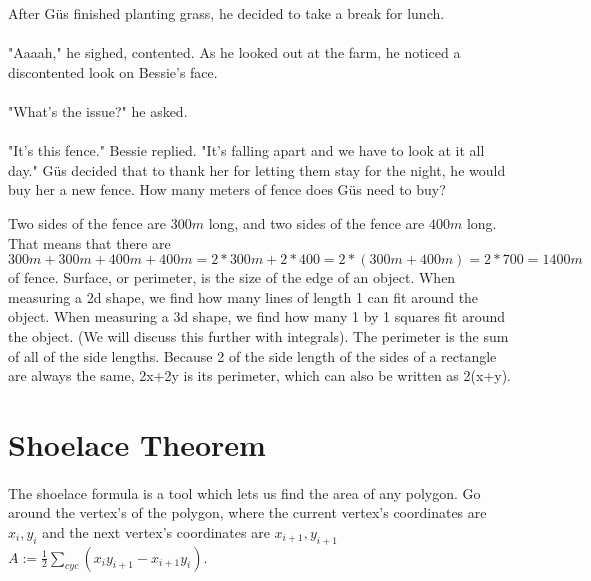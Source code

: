 {}
{After Güs finished planting grass, he decided to take a break for lunch. \paragraph{} "Aaaah," he sighed, contented. As he looked out at the farm, he noticed a discontented look on Bessie's face. \paragraph{}"What's the issue?" he asked. \paragraph{} "It's this fence." Bessie replied. "It's falling apart and we have to look at it all day." Güs decided that to thank her for letting them stay for the night, he would buy her a new fence. How many meters of fence does Güs need to buy?}
{Two sides of the fence are $300 m$ long, and two sides of the fence are $400 m$ long. That means that there are $300 m + 300 m + 400 m + 400 m = 2\ast 300 m+ 2\ast 400 = 2\ast(300 m + 400m) = 2\ast 700 = 1400 m$ of fence.}
{Surface, or perimeter, is the size of the edge of an object. When measuring a 2d shape, we find how many lines of length 1 can fit around the object. When measuring a 3d shape, we find how many 1 by 1 squares fit around the object. (We will discuss this further with integrals).
The perimeter is the sum of all of the side lengths. Because 2 of the side length of the sides of a rectangle are always the same, 2x+2y is its perimeter, which can also be written as 2(x+y).}
{}
\section{Shoelace Theorem}
\paragraph{} The shoelace formula is a tool which lets us find the area of any polygon. Go around the vertex's of the polygon, where the current vertex's coordinates are $x_i, y_i$ and the next vertex's coordinates are $x_{i+1}, y_{i+1}$ \linebreak
$A:={\frac{1}{2}}\sum_{cyc} (x_iy_{i+1}-x_{i+1}y_i)$.